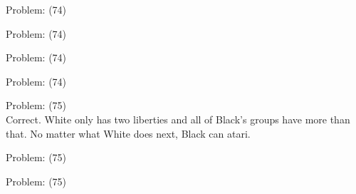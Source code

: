\documentclass[11pt]{article}
\begin{document}
\begin{minipage}[t]{0.5\textwidth}
  {\centering
  
  Problem: (74)\\
  
  }
\end{minipage}
\begin{minipage}[t]{0.5\textwidth}
  {\centering
  
  Problem: (74)\\
  
  }
\end{minipage}
\begin{minipage}[t]{0.5\textwidth}
  {\centering
  
  Problem: (74)\\
  
  }
\end{minipage}
\begin{minipage}[t]{0.5\textwidth}
  {\centering
  
  Problem: (74)\\
  
  }
\end{minipage}
\begin{minipage}[t]{0.5\textwidth}
  {\centering
  
  Problem: (75)\\
  Correct. White only has two liberties and all of Black's groups have more than that. No matter what White does next, Black can atari.\\
  }
\end{minipage}
\begin{minipage}[t]{0.5\textwidth}
  {\centering
  
  Problem: (75)\\
  
  }
\end{minipage}
\begin{minipage}[t]{0.5\textwidth}
  {\centering
  
  Problem: (75)\\
  
  }
\end{minipage}
\end{document}
